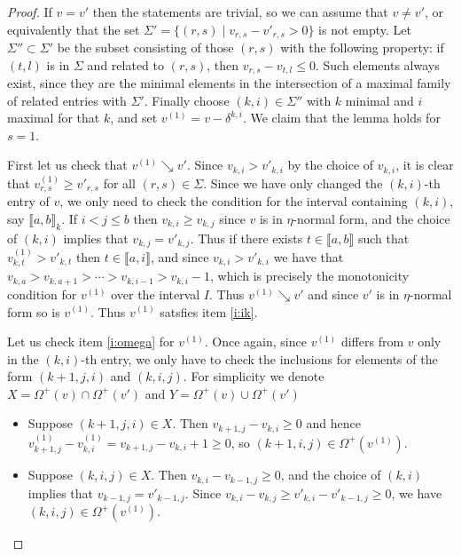\documentclass[11pt,fleqn]{article}
\newcommand\interval[1]{\llbracket #1 \rrbracket}
\begin{document}
\begin{proof}
If $v = v'$ then the statements are trivial, so we can assume that $v \neq v'$,
or equivalently that the set $\Sigma' = \{(r,s) \mid v_{r,s} - v'_{r,s} > 0\}$
is not empty. Let $\Sigma'' \subset \Sigma'$ be the subset consisting of those
$(r,s)$ with the following property: if $(t,l)$ is in $\Sigma$ and related to 
$(r,s)$, then $v_{r,s} - v_{t,l} \leq 0$. Such elements always exist, since 
they are the minimal elements in the intersection of a maximal family of 
related entries with $\Sigma'$. Finally choose $(k,i) \in \Sigma''$ with
$k$ minimal and $i$ maximal for that $k$, and set $v^{(1)} = v - 
\delta^{k,i}$. We claim that the lemma holds for $s = 1$.

First let us check that $v^{(1)} \searrow v'$. Since $v_{k,i} > v'_{k,i}$ by 
the choice of $v_{k,i}$, it is clear that $v^{(1)}_{r,s} \geq v'_{r,s}$ for all
$(r,s) \in \Sigma$. Since we have only changed the $(k,i)$-th entry of $v$, we
only need to check the condition for the interval containing $(k,i)$, say
$\interval{a,b}_k$. If $i < j \leq b$ then $v_{k,i} \geq v_{k,j}$ since $v$
is in $\eta$-normal form, and the choice of $(k,i)$ implies that $v_{k,j} = 
v'_{k,j}$. Thus if there exists $t \in \interval{a,b}$ such that $v^{(1)}_{k,t}
> v'_{k,t}$ then $t \in \interval{a,i}$, and since $v_{k,i} > v'_{k,i}$
we have that $v_{k,a} > v_{k,a+1} > \cdots > v_{k,i-1} > v_{k,i} -1$, which
is precisely the monotonicity condition for $v^{(1)}$ over the interval $I$.
Thus $v^{(1)} \searrow v'$ and since $v'$ is in $\eta$-normal form so is 
$v^{(1)}$. Thus $v^{(1)}$ satsfies item \ref{i:ik}.

Let us check item \ref{i:omega} for $v^{(1)}$. Once again, since $v^{(1)}$ 
differs from $v$ only in the $(k,i)$-th entry, we only have to check the
inclusions for elements of the form $(k+1,j,i)$ and $(k,i,j)$. For simplicity 
we denote $X = \Omega^+(v) \cap \Omega^+(v')$ and $Y = \Omega^+(v) \cup 
\Omega^+(v')$
\begin{itemize}
\item Suppose $(k+1,j,i) \in X$. Then $v_{k+1,j} - v_{k,i} \geq 0$ and hence 
$v^{(1)}_{k+1,j} - v^{(1)}_{k,i} = v_{k+1,j} - v_{k,i} + 1 \geq 0$, so 
$(k+1,i,j) \in \Omega^+(v^{(1)})$.

\item Suppose $(k,i,j) \in X$. Then $v_{k,i} - v_{k-1,j} \geq 0$, and the 
choice of $(k,i)$ implies that $v_{k-1,j} = v'_{k-1,j}$. Since $v_{k,i} - 
v_{k,j} \geq v'_{k,i} - v'_{k-1,j} \geq 0$, we have $(k,i,j) \in 
\Omega^+(v^{(1)})$.


\end{itemize}
\end{proof}
\end{document}
